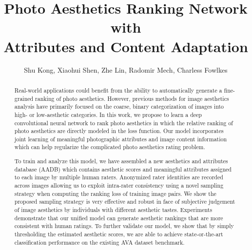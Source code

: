 \documentclass[runningheads]{llncs}
\begin{document}
\pagestyle{headings}
\mainmatter
\title{Photo Aesthetics Ranking Network with \\ Attributes and Content Adaptation} 



\author{Shu Kong, Xiaohui Shen, Zhe Lin, Radomir Mech, Charless Fowlkes}


\maketitle

\begin{abstract}
Real-world applications could benefit from the ability to automatically generate
a fine-grained ranking of photo aesthetics. However, previous methods for image
aesthetics analysis have primarily focused on the coarse, binary categorization of
images into high- or low-aesthetic categories.  In this work, we
propose to learn a deep convolutional neural network to rank photo
aesthetics in which the relative ranking of photo aesthetics are directly
modeled in the loss function. Our model incorporates joint learning of
meaningful photographic attributes and image content information which can help
regularize the complicated photo aesthetics rating problem.

To train and analyze this model, we have assembled a new aesthetics and attributes database (AADB)
which contains aesthetic scores and meaningful attributes assigned to each
image by multiple human raters. Anonymized rater identities are recorded across
images allowing us to exploit intra-rater consistency using a novel sampling
strategy when computing the ranking loss of training image pairs.  We show the
proposed sampling strategy is very effective and robust in face of subjective judgement of
image aesthetics by individuals with different aesthetic tastes. Experiments
demonstrate that our unified model can generate aesthetic rankings that are
more consistent with human ratings. To further validate our model, we show that
by simply thresholding the estimated aesthetic scores, we are able to achieve
state-or-the-art classification performance on the existing AVA dataset benchmark.
\end{abstract}
\end{document}
